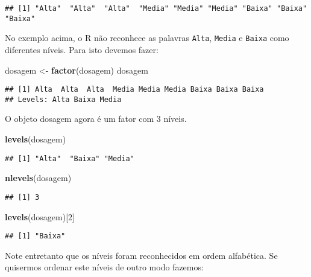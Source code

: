 \documentclass[
]{book}
\newenvironment{Shaded}{\begin{snugshade}}{\end{snugshade}}
\newcommand{\DecValTok}[1]{\textcolor[rgb]{0.00,0.00,0.81}{#1}}
\newcommand{\KeywordTok}[1]{\textcolor[rgb]{0.13,0.29,0.53}{\textbf{#1}}}
\newcommand{\NormalTok}[1]{#1}
\newcommand{\StringTok}[1]{\textcolor[rgb]{0.31,0.60,0.02}{#1}}
\begin{document}
\begin{verbatim}
## [1] "Alta"  "Alta"  "Alta"  "Media" "Media" "Media" "Baixa" "Baixa" "Baixa"
\end{verbatim}

No exemplo acima, o R não reconhece as palavras \texttt{Alta}, \texttt{Media} e \texttt{Baixa} como diferentes níveis. Para isto devemos fazer:

\begin{Shaded}
\begin{Highlighting}[]
\NormalTok{dosagem <-}\StringTok{ }\KeywordTok{factor}\NormalTok{(dosagem)}
\NormalTok{dosagem}
\end{Highlighting}
\end{Shaded}

\begin{verbatim}
## [1] Alta  Alta  Alta  Media Media Media Baixa Baixa Baixa
## Levels: Alta Baixa Media
\end{verbatim}

O objeto dosagem agora é um fator com 3 níveis.

\begin{Shaded}
\begin{Highlighting}[]
\KeywordTok{levels}\NormalTok{(dosagem)}
\end{Highlighting}
\end{Shaded}

\begin{verbatim}
## [1] "Alta"  "Baixa" "Media"
\end{verbatim}

\begin{Shaded}
\begin{Highlighting}[]
\KeywordTok{nlevels}\NormalTok{(dosagem)}
\end{Highlighting}
\end{Shaded}

\begin{verbatim}
## [1] 3
\end{verbatim}

\begin{Shaded}
\begin{Highlighting}[]
\KeywordTok{levels}\NormalTok{(dosagem)[}\DecValTok{2}\NormalTok{]}
\end{Highlighting}
\end{Shaded}

\begin{verbatim}
## [1] "Baixa"
\end{verbatim}

Note entretanto que os níveis foram reconhecidos em ordem alfabética. Se quisermos ordenar este níveis de outro modo fazemos:
\end{document}
